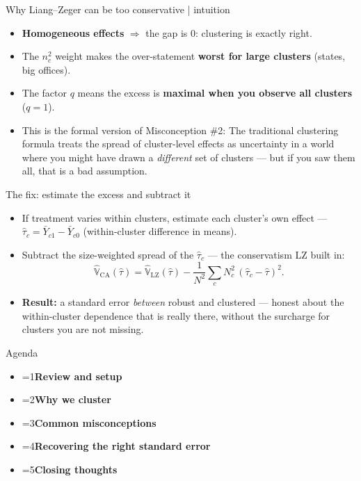 \documentclass[11pt,aspectratio=169]{beamer}
\newcommand{\bx}[1]{\textbf{#1}}
\newcounter{agcur}
\newcommand{\agitem}[2]{\item {\ifnum\value{agcur}=#1\bfseries\fi #2}}
\newcommand{\agenda}[1]{%
  \setcounter{agcur}{#1}%
  \begin{frame}{Agenda}
    \vspace{0.6em}
    \large
    \begin{itemize}\setlength{\itemsep}{11pt}
      \agitem{1}{Review and setup}
      \agitem{2}{Why we cluster}
      \agitem{3}{Common misconceptions}
      \agitem{4}{Recovering the right standard error}
      \agitem{5}{Closing thoughts}
    \end{itemize}
  \end{frame}}
\begin{document}
\begin{frame}{Why Liang--Zeger can be too conservative | intuition}
\begin{itemize}\setlength{\itemsep}{10pt}
  \item \bx{Homogeneous effects} $\Rightarrow$ the gap is $0$: clustering is exactly right.
  \item The $n_c^2$ weight makes the over-statement \bx{worst for large clusters} (states, big offices).
  \item The factor $q$ means the excess is \bx{maximal when you observe all clusters} ($q=1$).
  \item This is the formal version of Misconception \#2: The traditional clustering formula treats the spread of cluster-level
        effects as uncertainty in a world where you might have drawn a \emph{different} set of clusters --- but if you saw them all, that is a bad assumption.
\end{itemize}
\end{frame}

\begin{frame}{The fix: estimate the excess and subtract it}
\begin{itemize}\setlength{\itemsep}{8pt}
  \item If treatment varies within clusters, estimate each cluster's own effect ---
        $\hat\tau_c = \bar Y_{c1} - \bar Y_{c0}$ (within-cluster difference in means).
  \item Subtract the size-weighted spread of the $\hat\tau_c$ --- the conservatism LZ built in:
    \[
      \widehat{\mathbb{V}}_{\mathrm{CA}}(\hat\tau)
      = \widehat{\mathbb{V}}_{\mathrm{LZ}}(\hat\tau)
      - \frac{1}{N^2}\sum_{c} N_c^2\,(\hat\tau_c - \hat\tau)^2.
    \]
  \item \bx{Result:} a standard error \emph{between} robust and clustered --- honest about the within-cluster
        dependence that is really there, without the surcharge for clusters you are not missing.
\end{itemize}
\end{frame}

\agenda{5}
\end{document}
